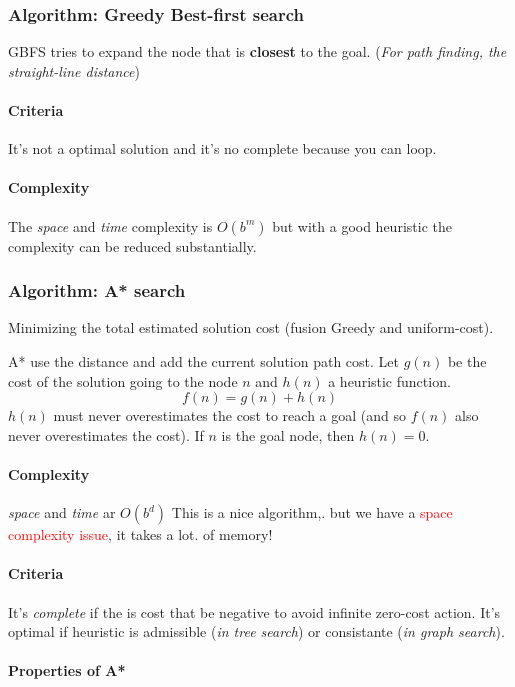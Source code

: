 \subsubsection{Algorithm: Greedy Best-first search}
GBFS tries to expand the node that is \textbf{closest} to the goal.
(\textit{For path finding, the straight-line distance})

\paragraph{Criteria} It's not a optimal solution and it's no complete
because you can loop.

\paragraph{Complexity} The \textit{space} and \textit{time} complexity
is $O(b^m)$ but with a good heuristic the complexity can be reduced
substantially.


\subsubsection{Algorithm: A* search}
Minimizing the total estimated solution cost (fusion Greedy and uniform-cost).

A* use the  distance and add the current solution  path cost. Let $g(n)$
be the cost of the solution going to the node $n$ and $h(n)$ a heuristic
function. $$f(n)  = g(n)  + h(n)$$ $h(n)$  must never  overestimates the
cost to reach a goal (and  so $f(n)$ also never overestimates the cost).
If $n$ is the goal node, then $h(n) = 0$.

\paragraph{Complexity}

\textit{space} and \textit{time} ar $O(b^d)$  This is a nice algorithm,.
but we have  a \textcolor{red}{space complexity issue}, it  takes a lot.
of memory!

\paragraph{Criteria} It's \textit{complete} if the is cost that be negative
to avoid infinite zero-cost action. 
It's optimal if heuristic is admissible (\textit{in tree search}) or consistante
(\textit{in graph search}).

\paragraph{Properties of A*}

